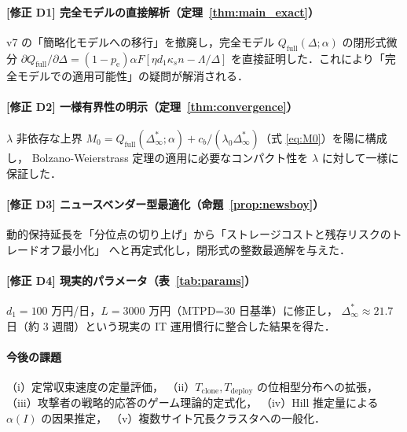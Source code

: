 \documentclass[12pt,a4paper]{article}
\theoremstyle{plain}
\theoremstyle{definition}
\theoremstyle{remark}
\newcommand{\pe}{p_{\mathrm{e}}}
\newcommand{\Qf}{Q_{\mathrm{full}}}
\newcommand{\alphI}{\alpha(I)}
\newcommand{\Dinf}{\Delta^{*}_{\infty}}
\begin{document}
\paragraph{[修正 D1] 完全モデルの直接解析（定理~\ref{thm:main_exact}）}
v7 の「簡略化モデルへの移行」を撤廃し，完全モデル $\Qf(\Delta;\alpha)$ の閉形式微分
$\partial\Qf/\partial\Delta=(1-\pe)\alpha F[\eta d_1\kappa_s n-\Lambda/\Delta]$
を直接証明した．これにより「完全モデルでの適用可能性」の疑問が解消される．

\paragraph{[修正 D2] 一様有界性の明示（定理~\ref{thm:convergence}）}
$\lambda$ 非依存な上界 $M_0=\Qf(\Dinf;\alpha)+c_b/(\lambda_0\Dinf)$（式 \eqref{eq:M0}）を陽に構成し，
Bolzano-Weierstrass 定理の適用に必要なコンパクト性を $\lambda$ に対して一様に保証した．

\paragraph{[修正 D3] ニュースベンダー型最適化（命題~\ref{prop:newsboy}）}
動的保持延長を「分位点の切り上げ」から「ストレージコストと残存リスクのトレードオフ最小化」
へと再定式化し，閉形式の整数最適解を与えた．

\paragraph{[修正 D4] 現実的パラメータ（表~\ref{tab:params}）}
$d_1=100$ 万円/日，$L=3000$ 万円（MTPD=30 日基準）に修正し，
$\Dinf\approx21.7$ 日（約 3 週間）という現実の IT 運用慣行に整合した結果を得た．

\paragraph{今後の課題}
（i）定常収束速度の定量評価，
（ii）$T_{\mathrm{clone}},T_{\mathrm{deploy}}$ の位相型分布への拡張，
（iii）攻撃者の戦略的応答のゲーム理論的定式化，
（iv）Hill 推定量による $\alphI$ の因果推定，
（v）複数サイト冗長クラスタへの一般化．
\end{document}
